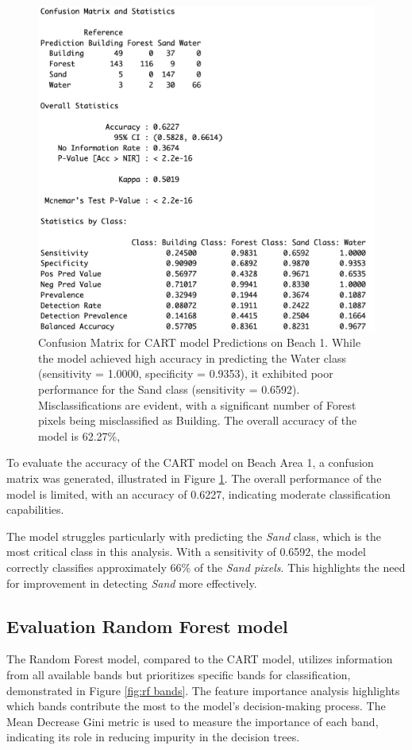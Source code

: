 \documentclass[a4paper,12pt]{article}
\begin{document}
\begin{figure}[!htbp]
    \centering
    \includegraphics[width=0.5\linewidth]{CART_Model/CART on Beach1: Confusionmatrix Beach1.png}
    \caption[Confusion Matrix for CART model Predictions on Beach 1]{Confusion Matrix for CART model Predictions on Beach 1. While the model achieved high accuracy in predicting the Water class (sensitivity = 1.0000, specificity = 0.9353), it exhibited poor performance for the Sand class (sensitivity = 0.6592). Misclassifications are evident, with a significant number of Forest pixels being misclassified as Building. The overall accuracy of the model is 62.27\%,}
    \label{fig:Cart Confusionmatrix BEach 1}
\end{figure}
To evaluate the accuracy of the CART model on Beach Area 1, a confusion matrix was generated, illustrated in Figure \ref{fig:Cart Confusionmatrix BEach 1}. The overall performance of the model is limited, with an accuracy of 0.6227, indicating moderate classification capabilities.

The model struggles particularly with predicting the \textit{Sand} class, which is the most critical class in this analysis. With a sensitivity of 0.6592, the model correctly classifies approximately 66\% of the \textit{Sand pixels}. This highlights the need for improvement in detecting \textit{Sand} more effectively.


\subsection{Evaluation Random Forest model}
The Random Forest model, compared to the CART model, utilizes information from all available bands but prioritizes specific bands for classification, demonstrated in Figure \ref{fig:rf bands}. The feature importance analysis highlights which bands contribute the most to the model’s decision-making process. The Mean Decrease Gini metric is used to measure the importance of each band, indicating its role in reducing impurity in the decision trees. 
\end{document}
